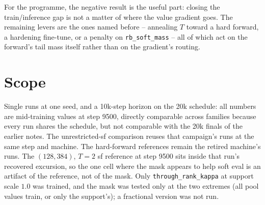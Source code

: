 \documentclass[11pt,a4paper]{article}
\newcommand{\code}[1]{\texttt{#1}}
\begin{document}
For the programme, the negative result is the useful part: closing the
train/inference gap is not a matter of where the value gradient goes. The
remaining levers are the ones named before -- annealing $T$ toward a hard
forward, a hardening fine-tune, or a penalty on \code{rb\_soft\_mass} -- all
of which act on the forward's tail mass itself rather than on the gradient's
routing.

\section{Scope}

Single runs at one seed, and a 10k-step horizon on the 20k schedule: all
numbers are mid-training values at step 9500, directly comparable across
families because every run shares the schedule, but not comparable with the
20k finals of the earlier notes. The unrestricted-sf comparison reuses that
campaign's runs at the same step and machine. The hard-forward references
remain the retired machine's runs. The $(128,384)$, $T=2$ sf reference at
step 9500 sits inside that run's recovered excursion, so the one cell where
the mask appears to help soft eval is an artifact of the reference, not of
the mask. Only \code{through\_rank\_kappa} at support scale $1.0$ was
trained, and the mask was tested only at the two extremes (all pool values
train, or only the support's); a fractional version was not run.
\end{document}
